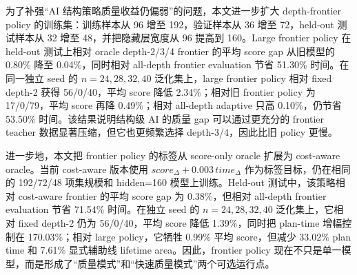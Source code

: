 \documentclass[UTF8,fontset=macnew,11pt]{ctexart}
\begin{document}
为了补强“AI 结构策略质量收益仍偏弱”的问题，本文进一步扩大 depth-frontier policy 的训练集：训练样本从 96 增至 192，验证样本从 36 增至 72，held-out 测试样本从 32 增至 48，并把隐藏层宽度从 96 提高到 160。Large frontier policy 在 held-out 测试上相对 oracle depth-2/3/4 frontier 的平均 score gap 从旧模型的 0.80\% 降至 0.04\%，同时相对 all-depth frontier evaluation 节省 51.30\% 时间。在同一独立 seed 的 $n=24,28,32,40$ 泛化集上，large frontier policy 相对 fixed depth-2 获得 56/0/40，平均 score 降低 2.34\%；相对旧 frontier policy 为 17/0/79，平均 score 再降 0.49\%；相对 all-depth adaptive 只高 0.10\%，仍节省 53.50\% 时间。该结果说明结构级 AI 的质量 gap 可以通过更充分的 frontier teacher 数据显著压缩，但它也更频繁选择 depth-3/4，因此比旧 policy 更慢。

进一步地，本文把 frontier policy 的标签从 score-only oracle 扩展为 cost-aware oracle。当前 cost-aware 版本使用 $score_{\Delta}+0.003\,time_{\Delta}$ 作为标签目标，仍在相同的 192/72/48 项集规模和 hidden=160 模型上训练。Held-out 测试中，该策略相对 cost-aware frontier 的平均 score gap 为 0.38\%，但相对 all-depth frontier evaluation 节省 71.54\% 时间。在独立 seed 的 $n=24,28,32,40$ 泛化集上，它相对 fixed depth-2 仍为 56/0/40，平均 score 降低 1.39\%，同时把 plan-time 增幅控制在 170.03\%；相对 large policy，它牺牲 0.99\% 平均 score，但减少 33.02\% plan time 和 7.61\% 显式辅助线 lifetime area。因此，frontier policy 现在不只是单一模型，而是形成了“质量模式”和“快速质量模式”两个可选运行点。
\end{document}
